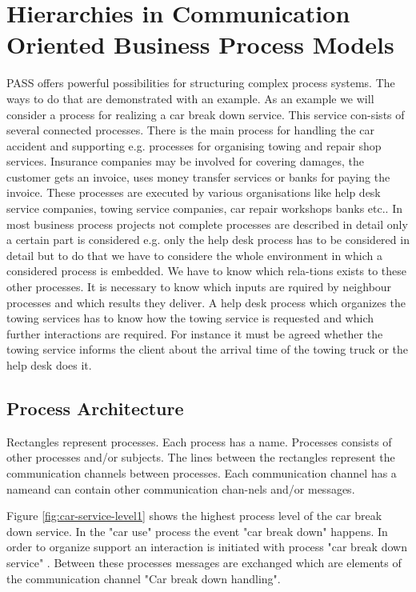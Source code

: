 \section{Hierarchies in Communication Oriented Business Process Models}
PASS  offers powerful possibilities for structuring complex process systems. The ways to do that are demonstrated with an example.
As an example we will consider a process for realizing a car break down service. This service con-sists of several connected processes. There is the main process for handling the car accident and supporting e.g. processes for organising towing and repair shop services. Insurance companies may be involved for covering damages, the customer gets an invoice, uses money transfer services or banks for paying the invoice. These processes are executed by various organisations like help desk service companies, towing service companies, car repair workshops banks etc.. In most business process projects not complete processes are described in detail only a certain part is considered e.g. only the help desk process has to be considered in detail but to do that we have to considere the whole environment in which a considered process is embedded. We have to know which rela-tions exists to these other processes. It is necessary to know which inputs are rquired by neighbour processes and which results they deliver. A help desk process which organizes the towing services has to know how the towing service is requested and which further interactions are required. For instance it must be agreed whether the towing service informs the client about the arrival time of the towing truck or the help desk does it.


\subsection{Process Architecture}

Rectangles represent processes. Each process has a name. Processes consists of other processes and/or subjects. The lines between the rectangles represent the communication channels between processes. Each communication channel has a nameand can contain other communication chan-nels and/or messages.

Figure \ref{fig:car-service-level1} shows the highest process level of the car break down service. In the "car use" process the event "car break down" happens. In order to organize support an interaction is initiated with process "car break down service" . Between these processes messages are exchanged which are elements of the communication channel "Car break down handling".\\


